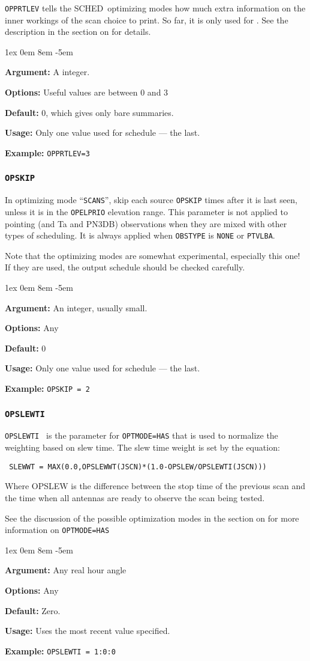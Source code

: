 \documentclass{report}
\newcommand{\schedb}{{\sc SCHED~}}
\newcommand{\rcwbox}[5]{
  \begin{list}{}{\parsep 1ex  \itemsep 0em
                 \leftmargin 8em  \itemindent -5em }
    \item {\bf Argument:} #1
    \item {\bf Options:}  #2
    \item {\bf Default:}  #3
    \item {\bf Usage:}    #4
    \item {\bf Example:}  #5
  \end{list}
}
\begin{document}
{\tt OPPRTLEV} tells the \schedb optimizing modes how much extra information
on the inner workings of the scan choice to print.  So far, it is only
used for .  See the description in
the section on  for details.

\rcwbox
{A integer.}
{Useful values are between 0 and 3}
{0, which gives only bare summaries.}
{Only one value used for schedule --- the last.}
{{\tt OPPRTLEV=3}}


\subsubsection{\label{MP:OPSKIP}{\tt OPSKIP}}

In optimizing mode ``{\tt SCANS}'', skip each source {\tt OPSKIP}
times after it is last seen, unless it is in the {\tt OPELPRIO}
elevation range.  This parameter is not applied to pointing (and Ta
and PN3DB) observations when they are mixed with other types of
scheduling.  It is always applied when {\tt OBSTYPE} is {\tt NONE}
or {\tt PTVLBA}.

Note that the optimizing modes are somewhat experimental, especially
this one!  If they are used, the output schedule should be checked
carefully.

\rcwbox
{An integer, usually small.}
{Any}
{0}
{Only one value used for schedule --- the last.}
{{\tt OPSKIP = 2 }}

\subsubsection{\label{MP:OPSLEWTI}{\tt OPSLEWTI}}

{\tt OPSLEWTI } is the parameter for {\tt OPTMODE=HAS} that is used
to normalize the weighting based on slew time.  The slew time weight
is set by the equation:
\begin{verbatim}
 SLEWWT = MAX(0.0,OPSLEWWT(JSCN)*(1.0-OPSLEW/OPSLEWTI(JSCN)))
\end{verbatim}
Where OPSLEW is the difference between the stop time of the previous
scan and the time when all antennas are ready to observe the scan
being tested.

See the discussion of the possible optimization modes in the section
on  for more information on
{\tt OPTMODE=HAS}

\rcwbox
{Any real hour angle}
{Any}
{Zero.}
{Uses the most recent value specified.}
{{\tt OPSLEWTI = 1:0:0 }}
\end{document}
